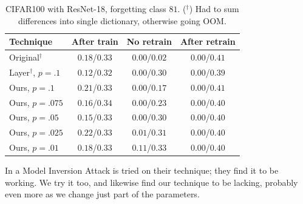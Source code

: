 \documentclass{article}
\begin{document}
\begin{table}
    \centering
    \caption{CIFAR100 with ResNet-18, forgetting class $81$. ($^\dagger$) Had to sum differences into single dictionary, otherwise going OOM.}
    \label{tab:cifar_resnet}
    \begin{tabular}{l | c | c c}
        Technique&After train&No retrain&After retrain\\
        \hline
        Original$^\dagger$&$0.18$/$0.33$&$0.00$/$0.02$&$0.00$/$0.41$\\
        Layer$^\dagger$, $p=.1$&$0.12$/$0.32$&$0.00$/$0.30$&$0.00$/$0.39$\\
        \hline
        Ours, $p=.1$&$0.21$/$0.33$&$0.00$/$0.17$&$0.00$/$0.41$\\
        Ours, $p=.075$&$0.16$/$0.34$&$0.00$/$0.23$&$0.00$/$0.40$\\
        Ours, $p=.05$&$0.15$/$0.33$&$0.00$/$0.30$&$0.00$/$0.40$\\
        Ours, $p=.025$&$0.22$/$0.33$&$0.01$/$0.31$&$0.00$/$0.40$\\
        Ours, $p=.01$&$0.18$/$0.33$&$0.11$/$0.33$&$0.00$/$0.40$\\
    \end{tabular}
\end{table}

In \cite{graves2021amnesiac} a Model Inversion Attack \cite{fredrikson2015inversion} is tried on their technique; they find it to be working. We try it too, and likewise find our technique to be lacking, probably even more as we change just part of the parameters.
\end{document}
